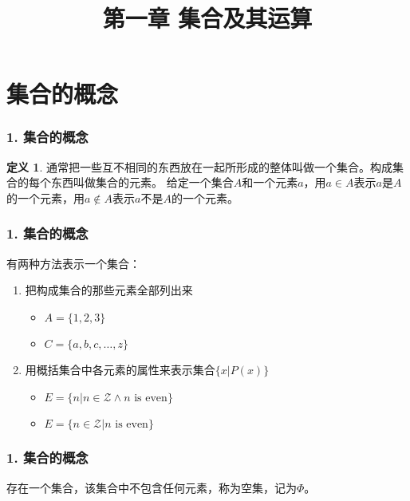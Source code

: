 \documentclass{beamer}
\begin{document}
\begin{CJK*}{UTF8}{gbsn}

\newtheorem{Thm}{定理}[section]
\theoremstyle{definition}
\newtheorem{Def}{定义}[section]
\theoremstyle{example}
\newtheorem*{Ex}{例：}
\date{}
\author{}

\title{第一章 集合及其运算}
\begin{frame}
  \titlepage
\end{frame}  
\section{集合的概念}
\begin{frame}
  \frametitle{1. 集合的概念}
  \begin{Def}
    通常把一些互不相同的东西放在一起所形成的整体叫做一个\alert{集合}。构成集合的每个东西叫做集合的\alert{元素}。
给定一个集合$A$和一个元素$a$，用\alert{$a \in A$}表示$a$是$A$的一个元素，用\alert{$a \notin A$}表示$a$不是$A$的一个元素。
  \end{Def}
\end{frame}

\begin{frame}
  \frametitle{1. 集合的概念}

有两种方法表示一个集合：
\begin{enumerate}
\item 把构成集合的那些元素全部列出来
  \begin{itemize}
\pause
  \item $A = \{1, 2, 3\}$
\pause
\item $C = \{a, b, c, \ldots, z\}$
  \end{itemize}
\pause
\item 用概括集合中各元素的属性来表示集合$\{x|P(x)\}$
\begin{itemize}
\pause
\item $E = \{n|n \in \mathcal{Z} \land n\text{ is even}\}$
\pause
\item $E = \{n \in \mathcal{Z} | n\text{ is even}\}$
\end{itemize}
\end{enumerate}


\end{frame}

\begin{frame}
  \frametitle{1. 集合的概念}

存在一个集合，该集合中不包含任何元素，称为\alert{空集}，记为$\Phi$。

\end{frame}


\end{CJK*}
\end{document}
